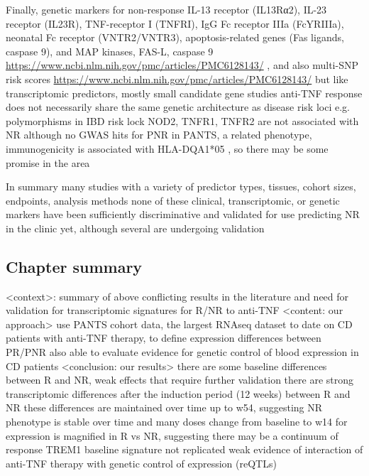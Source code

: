 \begin{outline}
\1 Finally, genetic markers for non-response \autocite{flamant2018InflammatoryBowelDisease}
    \2 IL-13 receptor (IL13Rα2), IL-23 receptor (IL23R), TNF-receptor I (TNFRI), IgG Fc receptor IIIa (FcYRIIIa), neonatal Fc receptor (VNTR2/VNTR3), apoptosis-related genes (Fas ligands, caspase 9), and MAP kinases, FAS-L, caspase 9 \url{https://www.ncbi.nlm.nih.gov/pmc/articles/PMC6128143/} \autocite{flamant2018InflammatoryBowelDisease}, and also multi-SNP risk scores \url{https://www.ncbi.nlm.nih.gov/pmc/articles/PMC6128143/}
    \2 but like transcriptomic predictors, mostly small candidate gene studies
    \2 anti-TNF response does not necessarily share the same genetic architecture as disease risk loci e.g. polymorphisms in IBD risk lock NOD2, TNFR1, TNFR2 are not associated with NR \autocite{digby-bell2019InterrogatingHostImmunity,noor2020PersonalisedMedicineCrohn}
    \2 although no GWAS hits for PNR in PANTS, a related phenotype, immunogenicity is associated with HLA-DQA1*05 \autocite{sazonovs2019HLADQA105Carriage}, so there may be some promise in the area

\1 In summary many studies with a variety of predictor types, tissues, cohort sizes, endpoints, analysis methods
    \2 none of these clinical, transcriptomic, or genetic markers have been sufficiently discriminative and validated for use predicting NR in the clinic yet, although several are undergoing validation \autocite{noor2020PersonalisedMedicineCrohn}

\subsection{Chapter summary}

\1 <context>: summary of above
    \2 conflicting results in the literature and need for validation for transcriptomic signatures for R/NR to anti-TNF 
\1 <content: our approach> 
    \2 use PANTS cohort data, the largest RNAseq dataset to date on CD patients with anti-TNF therapy, to define expression differences between PR/PNR
    \2 also able to evaluate evidence for genetic control of blood expression in CD patients
\1 <conclusion: our results> 
    \2 there are some baseline differences between R and NR, weak effects that require further validation
    \2 there are strong transcriptomic differences after the induction period (12 weeks) between R and NR
    \2 these differences are maintained over time up to w54, suggesting NR phenotype is stable over time and many doses
    \2 change from baseline to w14 for expression is magnified in R vs NR, suggesting there may be a continuum of response
    \2 TREM1 baseline signature not replicated
    \2 weak evidence of interaction of anti-TNF therapy with genetic control of expression (reQTLs)


\end{outline}
